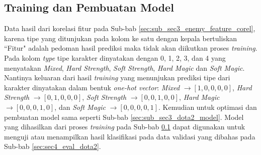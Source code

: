 \subsection{Training dan Pembuatan Model}
\label{sec:sub_sec3_enemy_char_train}
\vspace{1ex}

Data hasil dari korelasi fitur pada Sub-bab \ref{sec:sub_sec3_enemy_feature_corel}, karena tipe yang ditunjukan pada kolom ke satu dengan kepala bertuliskan ``Fitur" adalah pedoman hasil prediksi maka tidak akan diikutkan proses \textit{training}. Pada kolom \textit{type} tipe karakter dinyatakan dengan 0, 1, 2, 3, dan 4 yang menyatakan \textit{Mixed}, \textit{Hard Strength}, \textit{Soft Strength}, \textit{Hard Magic} dan \textit{Soft Magic}. Nantinya keluaran dari hasil \textit{training} yang menunjukan prediksi tipe dari karakter dinyatakan dalam bentuk \textit{one-hot vector}: \textit{Mixed} $\rightarrow [1, 0, 0, 0, 0]$, \textit{Hard Strength} $\rightarrow [0, 1, 0, 0, 0]$, \textit{Soft Strength} $\rightarrow [0, 0, 1, 0, 0]$, \textit{Hard Magic} $\rightarrow [0, 0, 0, 1, 0]$, dan \textit{Soft Magic} $\rightarrow [0, 0, 0, 0, 1]$. Kemudian untuk optimasi dan pembuatan model sama seperti Sub-bab \ref{sec:sub_sec3_dota2_model}. Model yang dihasilkan dari proses \textit{training} pada Sub-bab \ref{sec:sub_sec3_enemy_char_train} dapat digunakan untuk menguji atau menampilkan hasil klasifikasi pada data validasi yang dibahas pada Sub-bab \ref{sec:sec4_eval_dota2}.
\vspace{1ex}